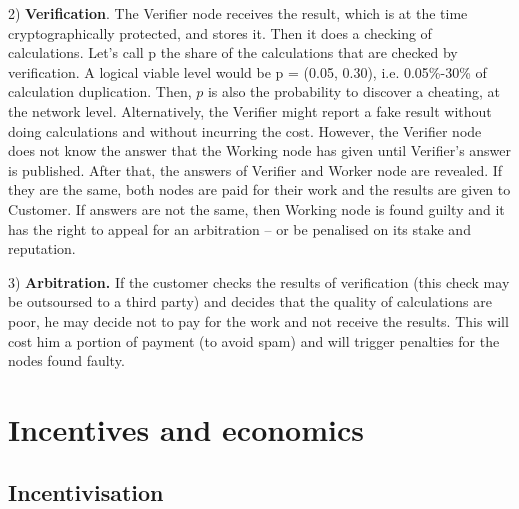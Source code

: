 \documentclass{article}
\begin{document}
2) \textbf{Verification}. The Verifier node receives the result, which is at
the time cryptographically protected, and stores it. Then it does a checking
of calculations. Let's call p the share of the calculations that are checked
by verification. A logical viable level would be p = (0.05, 0.30), i.e.
0.05\%-30\% of calculation duplication. Then, $p$ is also the probability to
discover a cheating, at the network level. Alternatively, the Verifier might
report a fake result without doing calculations and without incurring the
cost. However, the Verifier node does not know the answer that the Working
node has given until Verifier's answer is published. After that, the answers
of Verifier and Worker node are revealed. If they are the same, both nodes
are paid for their work and the results are given to Customer. If answers
are not the same, then Working node is found guilty and it has the right to
appeal for an arbitration -- or be penalised on its stake and reputation.

3) \textbf{Arbitration. }If the customer checks the results of verification
(this check may be outsoursed to a third party) and decides that the quality
of calculations are poor, he may decide not to pay for the work and not
receive the results. This will cost him a portion of payment (to avoid spam)
and will trigger penalties for the nodes found faulty.

\section{Incentives and economics}

\subsection{Incentivisation}
\end{document}
